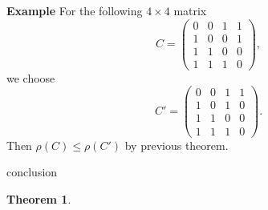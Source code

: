 \documentclass{beamer}
\theoremstyle{plain}
\newtheorem{thm}{Theorem}[section]
\theoremstyle{definition}
\begin{document}
\begin{frame}{\bf Example}
For the following $4\times 4$ matrix  
$$C=\begin{pmatrix}
0 & 0 & 1 & 1\\ 
1 & 0 & 0 & 1\\ 
1 & 1 & 0 & 0\\ 
1 & 1 & 1 & 0
\end{pmatrix},$$ 
we choose  
$$C'=\begin{pmatrix}
0 & 0 & 1 & 1\\
1 & 0 & 1 &  0\\
1 & 1 & 0 & 0\\
1 & 1 & 1 & 0
\end{pmatrix}.$$ 
Then 
$\rho(C)\leq \rho(C')$ by previous theorem. 
\end{frame}



\begin{frame}{conclusion}
    \begin{thm}
    \end{thm}
\end{frame}
\end{document}
